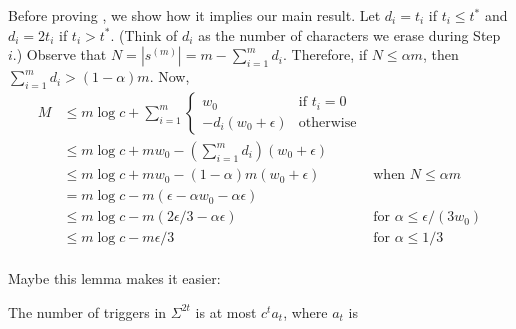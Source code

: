 \documentclass{patmorin}
\begin{document}
Before proving , we show how it implies our main result.  Let $d_i=t_i$ if $t_i\le t^*$ and $d_i=2t_i$ if $t_i>t^*$.  (Think of $d_i$ as the number of characters we erase during Step~$i$.)  Observe that $N=|s^{(m)}|=m-\sum_{i=1}^m d_i$.  Therefore, if $N\le \alpha m$, then $\sum_{i=1}^m d_i > (1-\alpha)m$.  Now,
\begin{align*}
  M & \le m\log c + \sum_{i=1}^m 
     \begin{cases}
         w_0 & \text{if $t_i=0$} \\
         -d_i(w_0+\epsilon) & \text{otherwise} 
       \end{cases} \\
     & \le m\log c + mw_0 - \left(\sum_{i=1}^m d_i\right)(w_0+\epsilon) \\ 
     & \le m\log c + mw_0 - (1-\alpha)m(w_0+\epsilon) 
     & \text{when $N\le\alpha m$} \\ 
     & = m\log c - m(\epsilon - \alpha w_0 - \alpha\epsilon) \\ 
     & \le m\log c - m(2\epsilon/3 - \alpha\epsilon) 
     & \text{for $\alpha \le \epsilon/(3w_0)$} \\ 
     & \le m\log c - m\epsilon/3 
     & \text{for $\alpha \le 1/3$} \\ 
\end{align*} 



Maybe this lemma makes it easier:

\begin{lem}
  The number of triggers in $\Sigma^{2t}$ is at most $c^t a_t$, where $a_t$ is 
\end{lem}
\end{document}
